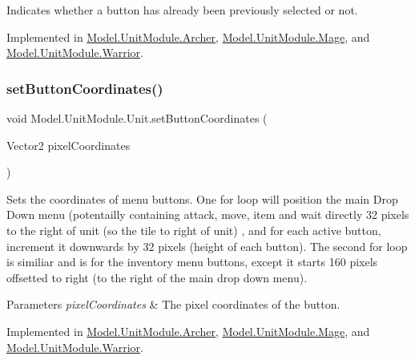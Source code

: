 Indicates whether a button has already been previously selected or not. 

Implemented in \hyperlink{class_model_1_1_unit_module_1_1_archer_ae3a17a1d3f60e9e35e0d25c45158a8eb}{Model.\+Unit\+Module.\+Archer}, \hyperlink{class_model_1_1_unit_module_1_1_mage_a7a6f09d97b1065dfadd2b7722b80045d}{Model.\+Unit\+Module.\+Mage}, and \hyperlink{class_model_1_1_unit_module_1_1_warrior_a6727d75c6005f0d8e72d64ad302e4fec}{Model.\+Unit\+Module.\+Warrior}.

\hypertarget{interface_model_1_1_unit_module_1_1_unit_ad48776b3bd231bf80d2eec87b7498302}{}\label{interface_model_1_1_unit_module_1_1_unit_ad48776b3bd231bf80d2eec87b7498302} 
\subsubsection{\texorpdfstring{set\+Button\+Coordinates()}{setButtonCoordinates()}}
{\footnotesize\ttfamily void Model.\+Unit\+Module.\+Unit.\+set\+Button\+Coordinates (\begin{DoxyParamCaption}\item[{Vector2}]{pixel\+Coordinates }\end{DoxyParamCaption})}

Sets the coordinates of menu buttons. One for loop will position the main Drop Down menu (potentailly containing attack, move, item and wait directly 32 pixels to the right of unit (so the tile to right of unit) , and for each active button, increment it downwards by 32 pixels (height of each button). The second for loop is similiar and is for the inventory menu buttons, except it starts 160 pixels offsetted to right (to the right of the main drop down menu). 
\begin{DoxyParams}{Parameters}
{\em pixel\+Coordinates} & The pixel coordinates of the button. \\
\hline
\end{DoxyParams}


Implemented in \hyperlink{class_model_1_1_unit_module_1_1_archer_ad1e9c182bc11a0ea83134421a24c7987}{Model.\+Unit\+Module.\+Archer}, \hyperlink{class_model_1_1_unit_module_1_1_mage_a2cbdb537e8039e19367b2d9905847e1b}{Model.\+Unit\+Module.\+Mage}, and \hyperlink{class_model_1_1_unit_module_1_1_warrior_ac988bd449f7f88fd8108278107cdba77}{Model.\+Unit\+Module.\+Warrior}.


